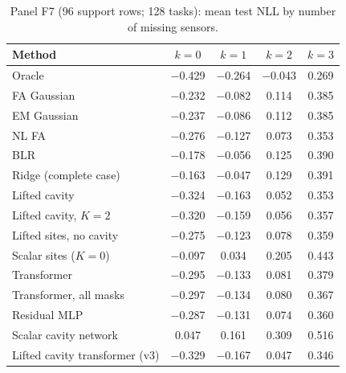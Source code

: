 \begin{table}[t]
\centering\small
\caption{\label{tab:moreF7}Panel F7 (96 support rows; 128 tasks): mean test NLL by number of missing sensors.}
\begin{tabular}{lcccc}
\toprule
Method & $k{=}0$ & $k{=}1$ & $k{=}2$ & $k{=}3$\\
\midrule
Oracle & $-$0.429 & $-$0.264 & $-$0.043 & 0.269\\
FA Gaussian & $-$0.232 & $-$0.082 & 0.114 & 0.385\\
EM Gaussian & $-$0.237 & $-$0.086 & 0.112 & 0.385\\
NL FA & $-$0.276 & $-$0.127 & 0.073 & 0.353\\
BLR & $-$0.178 & $-$0.056 & 0.125 & 0.390\\
Ridge (complete case) & $-$0.163 & $-$0.047 & 0.129 & 0.391\\
Lifted cavity & $-$0.324 & $-$0.163 & 0.052 & 0.353\\
Lifted cavity, $K=2$ & $-$0.320 & $-$0.159 & 0.056 & 0.357\\
Lifted sites, no cavity & $-$0.275 & $-$0.123 & 0.078 & 0.359\\
Scalar sites ($K=0$) & $-$0.097 & 0.034 & 0.205 & 0.443\\
Transformer & $-$0.295 & $-$0.133 & 0.081 & 0.379\\
Transformer, all masks & $-$0.297 & $-$0.134 & 0.080 & 0.367\\
Residual MLP & $-$0.287 & $-$0.131 & 0.074 & 0.360\\
Scalar cavity network & 0.047 & 0.161 & 0.309 & 0.516\\
Lifted cavity transformer (v3) & $-$0.329 & $-$0.167 & 0.047 & 0.346\\
\bottomrule
\end{tabular}
\end{table}

